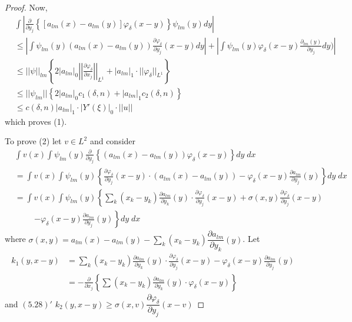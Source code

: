 \begin{proof}
Now,
{\fontsize{10pt}{12pt}\selectfont
\begin{align*}
& \int \left|\frac{\partial}{\partial y_j}\left\{ \left[a_{lm}(x)-a_{lm}
    (y) \right] \varphi_\delta (x-y) \right\} \psi_{lm} (y) dy \right|\\  
& \leq \left| \int \psi_{lm} (y)(a_{lm} (x)- a_{lm}(y) )\frac{\partial
    \varphi_\delta}{\partial y_j} (x-y ) dy \right| + \left| \int
  \psi_{lm} (y) \varphi_\delta (x-y) \frac{\partial_{lm}(y)}{\partial
    y_j} dy) \right|\\ 
& \leq || \psi||_{lm} \left\{ 2|a_{lm}|_0 \left|\left| \frac{\partial
    \varphi_\delta}{\partial x_j}\right|\right|_{L^1} +|a_{lm}|_1 \cdot ||
  \varphi_\delta ||_{L^1}\right\}\\ 
& \leq || \psi_{lm}|| \left\{2 |a_{lm}|_0 c_1 (\delta, n) + |a_{lm}|_1
  c_2 (\delta, n)\right\}\\ 
& \leq c(\delta, n)|a_{lm}|_1 \cdot |Y' (\xi ) |_0 \cdot || u || 
\end{align*}}\relax\pageoriginale
which proves (1).

To prove (2) let $v \in L^2$ and consider
{\fontsize{10pt}{12pt}\selectfont
\begin{align*}
& \int v(x) \int \psi_{lm}(y) \frac{\partial}{\partial y_j}\left\{
  (a_{lm}(x)-a_{lm}(y)) \varphi_\delta (x-y) \right\}  dy \; dx\\ 
& = \int v(x) \int \psi_{lm} (y) \left\{ \frac{\partial
    \varphi_\delta}{\partial y_j} (x-y) \cdot (a_{lm} (x)-a_{lm}(y))-
  \varphi_\delta (x-y) \frac{\partial a_{lm}}{\partial y_j}(y) \right\}
   dy \; dx\\ 
& = \int v(x) \int \psi_{lm} (y) \left\{ \sum_k (x_{k}-y_k) \frac{\partial
    a_{lm}}{\partial y_k} (y) \cdot  \frac{\partial \varphi_\delta}{\partial
    y_j}(x-y)+ \sigma (x, y) \frac{\partial \varphi_\delta}{\partial
    y_j} (x-y) \right. \\
& \hspace{1cm}  \left. - \varphi_\delta (x-y) \frac{\partial a_{lm}}{\partial
    y_j}(y) \right\} dy \; dx
\end{align*}}\relax
where $\sigma (x, y) = a_{lm}(x) - a_{lm}(y) - \sum\limits_k (x_k-y_k)
\dfrac{\partial a_{lm}}{\partial y_k}(y)$. Let  
\begin{align*}
k_1 (y, x-y) & =  \sum_{k} (x_k-y_k) \frac{\partial a_{lm}}{\partial
  y_k}(y) \cdot \frac{\partial \varphi_\delta}{\partial y_j}(x-y)-
\varphi_\delta (x-y) \frac{\partial a_{lm}}{\partial y_j}(y)\\ 
& = - \frac{\partial}{\partial x_j} \left\{ \sum (x_k- y_k )
\frac{\partial a_{lm}}{\partial y_k}(y) \cdot \varphi_\delta
(x-y)\right\} \tag{5.28}\label{chap3-eq5.28}  
\end{align*}
and $(5.28)'$ \qquad $k_2 (y, x-y) \geq \sigma (x, v) \dfrac{\partial
  \varphi_\delta}{\partial y_j}(x-v)$ 


\end{proof}
